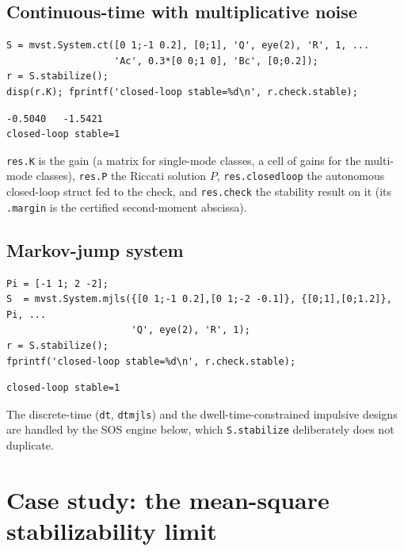 \documentclass[11pt,oneside]{report}
\newcommand{\code}[1]{\texttt{#1}}
\begin{document}
\hypertarget{continuous-time-with-multiplicative-noise}{%
\subsection{Continuous-time with multiplicative noise}\label{continuous-time-with-multiplicative-noise}}

\begin{lstlisting}[style=matlabstyle]
S = mvst.System.ct([0 1;-1 0.2], [0;1], 'Q', eye(2), 'R', 1, ...
                   'Ac', 0.3*[0 0;1 0], 'Bc', [0;0.2]);
r = S.stabilize();
disp(r.K); fprintf('closed-loop stable=%d\n', r.check.stable);
\end{lstlisting}

\begin{lstlisting}[style=outputstyle]
   -0.5040   -1.5421
closed-loop stable=1
\end{lstlisting}

\code{res.K} is the gain (a matrix for single-mode classes, a cell of gains for the
multi-mode classes), \code{res.P} the Riccati solution \(P\), \code{res.closedloop} the
autonomous closed-loop struct fed to the check, and \code{res.check} the stability
result on it (its \code{.margin} is the certified second-moment abscissa).

\hypertarget{markov-jump-system}{%
\subsection{Markov-jump system}\label{markov-jump-system}}

\begin{lstlisting}[style=matlabstyle]
Pi = [-1 1; 2 -2];
S  = mvst.System.mjls({[0 1;-1 0.2],[0 1;-2 -0.1]}, {[0;1],[0;1.2]}, Pi, ...
                      'Q', eye(2), 'R', 1);
r = S.stabilize();
fprintf('closed-loop stable=%d\n', r.check.stable);
\end{lstlisting}

\begin{lstlisting}[style=outputstyle]
closed-loop stable=1
\end{lstlisting}

The discrete-time (\code{dt}, \code{dtmjls}) and the dwell-time-constrained impulsive
designs are handled by the SOS engine below, which \code{S.stabilize} deliberately
does not duplicate.

\hypertarget{case-study-the-mean-square-stabilizability-limit}{%
\section{Case study: the mean-square stabilizability limit}\label{case-study-the-mean-square-stabilizability-limit}}
\end{document}
